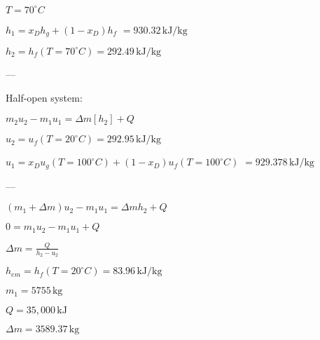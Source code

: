 \( T = 70^\circ C \)  

\( h_1 = x_D h_g + (1 - x_D) h_f \)  
\( = 930.32 \, \text{kJ/kg} \)  

\( h_2 = h_f (T = 70^\circ C) = 292.49 \, \text{kJ/kg} \)  

---

Half-open system:  

\( m_2 u_2 - m_1 u_1 = \Delta m [h_2] + Q \)  

\( u_2 = u_f (T = 20^\circ C) = 292.95 \, \text{kJ/kg} \)  

\( u_1 = x_D u_g (T = 100^\circ C) + (1 - x_D) u_f (T = 100^\circ C) \)  
\( = 929.378 \, \text{kJ/kg} \)  

---

\( (m_1 + \Delta m) u_2 - m_1 u_1 = \Delta m h_2 + Q \)  

\( 0 = m_1 u_2 - m_1 u_1 + Q \)  

\( \Delta m = \frac{Q}{h_2 - u_2} \)  

\( h_{em} = h_f (T = 20^\circ C) = 83.96 \, \text{kJ/kg} \)  

\( m_1 = 5755 \, \text{kg} \)  

\( Q = 35,000 \, \text{kJ} \)  

\( \Delta m = 3589.37 \, \text{kg} \)